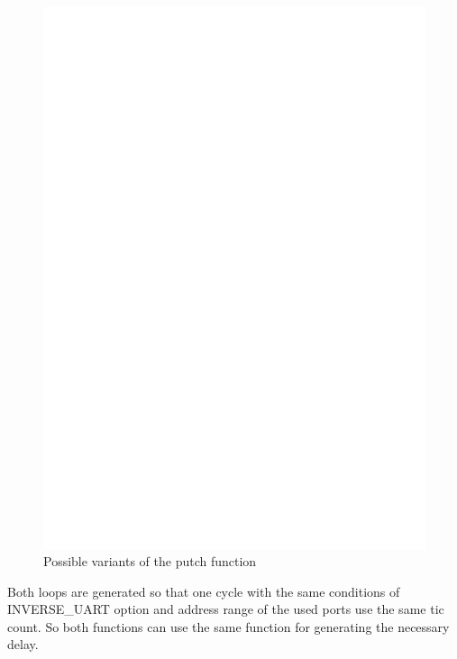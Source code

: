 \begin{figure}[H]
\centering
\includegraphics[]{../FIG/uart_putch_timing.eps}
\caption{Possible variants of the putch function}
\label{fig:putch_timing}
\end{figure}

Both loops are generated so that one cycle with the same conditions of INVERSE\_UART option and
address range of the used ports use the same tic count.
So both functions can use the same function for generating the necessary delay.

